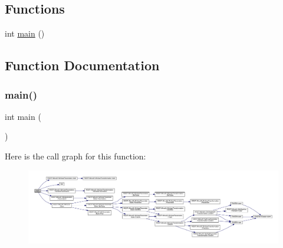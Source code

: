 \subsection*{Functions}
\begin{DoxyCompactItemize}
\item 
int \mbox{\hyperlink{adat-devel_2other__libs_2minuit_2test_2MnSim_2ReneTest_8cxx_ae66f6b31b5ad750f1fe042a706a4e3d4}{main}} ()
\end{DoxyCompactItemize}


\subsection{Function Documentation}
\mbox{\label{adat-devel_2other__libs_2minuit_2test_2MnSim_2ReneTest_8cxx_ae66f6b31b5ad750f1fe042a706a4e3d4}} 
\subsubsection{\texorpdfstring{main()}{main()}}
{\footnotesize\ttfamily int main (\begin{DoxyParamCaption}{ }\end{DoxyParamCaption})}

Here is the call graph for this function\+:
\nopagebreak
\begin{figure}[H]
\begin{center}
\leavevmode
\includegraphics[width=350pt]{db/d4e/adat-devel_2other__libs_2minuit_2test_2MnSim_2ReneTest_8cxx_ae66f6b31b5ad750f1fe042a706a4e3d4_cgraph}
\end{center}
\end{figure}
